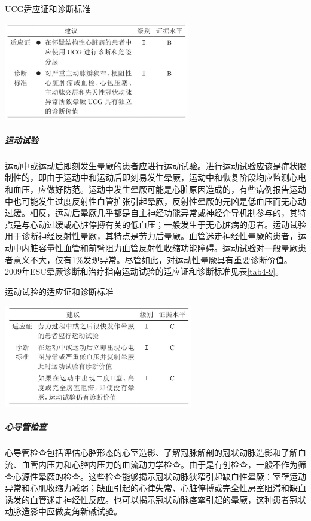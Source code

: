 \begin{table}[htbp]
\centering
\caption{UCG适应证和诊断标准}
\label{tab4-8}
\includegraphics[width=3.20833in,height=1.6875in]{./images/Image00025.jpg}
\end{table}

\subparagraph{运动试验}

运动中或运动后即刻发生晕厥的患者应进行运动试验。进行运动试验应该是症状限制性的，即由于运动中和运动后即刻易发生晕厥，运动中和恢复阶段均应监测心电和血压，应做好防范。运动中发生晕厥可能是心脏原因造成的，有些病例报告运动中也可能发生过度反射性血管扩张引起晕厥，反射性晕厥的元凶是低血压而无心动过缓。相反，运动后晕厥几乎都是自主神经功能异常或神经介导机制参与的，其特点是与心动过缓或心脏停搏有关的低血压；一般发生于无心脏病的患者。运动试验用于诊断神经反射性晕厥，其特点是劳力后晕厥。血管迷走神经性晕厥的患者，运动中内脏容量性血管和前臂阻力血管反射性收缩功能障碍。运动试验对一般晕厥患者意义不大，仅有1\%发现异常。尽管如此，对运动性晕厥具有重要诊断价值。2009年ESC晕厥诊断和治疗指南运动试验的适应证和诊断标准见表\ref{tab4-9}。

\begin{table}[htbp]
\centering
\caption{运动试验的适应证和诊断标准}
\label{tab4-9}
\includegraphics[width=3.25in,height=1.76042in]{./images/Image00026.jpg}
\end{table}

\subparagraph{心导管检查}

心导管检查包括评估心腔形态的心室造影、了解冠脉解剖的冠状动脉造影和了解血流、血管内压力和心腔内压力的血流动力学检查。由于是有创检查，一般不作为筛查心源性晕厥的检查。这些检查能够揭示冠状动脉狭窄引起缺血性晕厥：室壁运动异常和心肌收缩力减弱；缺血引起的心律失常、心脏停搏或完全性房室阻滞和缺血诱发的血管迷走神经性反应。也可以揭示冠状动脉痉挛引起的晕厥，这种患者冠状动脉造影中应做麦角新碱试验。

